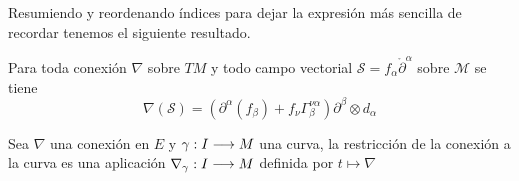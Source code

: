Resumiendo y reordenando índices para dejar la expresión más sencilla de recordar tenemos el siguiente resultado.
\begin{proposition}
  Para toda conexión $\nabla$ sobre $TM$ y todo campo vectorial $\mathcal{S}=f_\alpha\mathring{\partial}^\alpha$
  sobre $\mathcal{M}$ se tiene
  \begin{equation}
    \label{eq:conexion-coordenadas}
    \nabla(\mathcal{S}) = (\partial^\alpha(f_\beta)+f_\nu\Gamma_\beta^{\nu\alpha})\partial^\beta\otimes d_\alpha
  \end{equation}
\end{proposition}

Sea $\nabla$ una conexión en $E$ y $\gamma:I\longrightarrow M$ una curva, la restricción de la conexión a la curva es una
aplicación $\nabla_\gamma:I\longrightarrow M$ definida por $t\mapsto\nabla$

